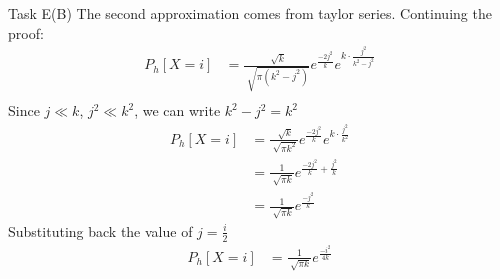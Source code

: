 \begin{task}{Task E(B)}
	The second approximation comes from taylor series.
	Continuing the proof:
	\begin{align}
		P_h[X=i] & = \frac{\sqrt[]{k}}{\sqrt[]{\pi (k^2-j^2)}}
		e^{\frac{-2j^2}{k}}e^{k\cdot{\frac{j^2}{k^2-j^2}}}     \\
	\end{align}
	Since $j\ll k$, $j^2 \ll k^2$, we can write $k^2-j^2=k^2$
	\begin{align}
		P_h[X=i] & = \frac{\sqrt[]{k}}{\sqrt[]{\pi
		k^2}}e^{\frac{-2j^2}{k}}e^{k\cdot{\frac{j^2}{k^2}}}     \\
		         & = \frac{1}{\sqrt[]{\pi
				k}}e^{\frac{-2j^2}{k}+\frac{j^2}{k}}
		\\
		         & = \frac{1}{\sqrt[]{\pi k}}e^{\frac{-j^2}{k}}
	\end{align}
	Substituting back the value of $j = \frac{i}{2}$
	\begin{align}
		P_h[X=i] & = \frac{1}{\sqrt[]{\pi k}}e^{\frac{-i^2}{4k}}
	\end{align}


\end{task}
